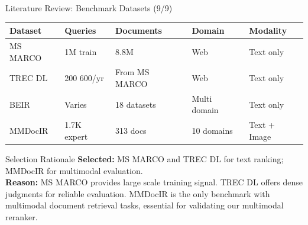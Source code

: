 \documentclass[aspectratio=169,xcolor=dvipsnames]{beamer}
\begin{document}
\begin{frame}{Literature Review: Benchmark Datasets (9/9)}
    \scriptsize
    \begin{table}
        \centering
        \renewcommand{\arraystretch}{1.1}
        \begin{tabular}{p{}|p{}|p{}|p{}|p{}}
        \toprule
        \textbf{Dataset} & \textbf{Queries} & \textbf{Documents} & \textbf{Domain} & \textbf{Modality} \\
        \midrule
        MS MARCO \cite{nguyen2016ms} & 1M train & 8.8M & Web & Text only \\
        \midrule
        TREC DL \cite{craswell2020overview} & 200 600/yr & From MS MARCO & Web & Text only \\
        \midrule
        BEIR \cite{thakur2021beir} & Varies & 18 datasets & Multi domain & Text only \\
        \midrule
        MMDocIR \cite{dong2025mmdocir} & 1.7K expert & 313 docs & 10 domains & Text + Image \\
        \bottomrule
        \end{tabular}
    \end{table}
    
    \vspace{0.3em}
    \begin{block}{Selection Rationale}
        \textbf{Selected:} MS MARCO and TREC DL for text ranking; MMDocIR for multimodal evaluation. \\
        \textbf{Reason:} MS MARCO provides large scale training signal. TREC DL offers dense judgments for reliable evaluation. MMDocIR is the only benchmark with multimodal document retrieval tasks, essential for validating our multimodal reranker.
    \end{block}
\end{frame}
\end{document}
